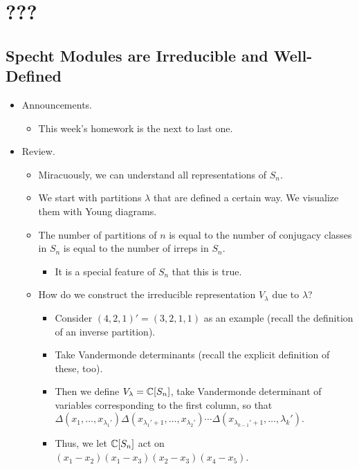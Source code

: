 \documentclass[../notes.tex]{subfiles}
\begin{document}
\chapter{???}
\section{Specht Modules are Irreducible and Well-Defined}
\begin{itemize}
    \item {}Announcements.
    \begin{itemize}
        \item This week's homework is the next to last one.
    \end{itemize}
    \item Review.
    \begin{itemize}
        \item Miracuously, we can understand all representations of $S_n$.
        \item We start with partitions $\lambda$ that are defined a certain way. We visualize them with Young diagrams.
        \item The number of partitions of $n$ is equal to the number of conjugacy classes in $S_n$ is equal to the number of irreps in $S_n$.
        \begin{itemize}
            \item It is a special feature of $S_n$ that this is true.
        \end{itemize}
        \item How do we construct the irreducible representation $V_\lambda$ due to $\lambda$?
        \begin{itemize}
            \item Consider $(4,2,1)'=(3,2,1,1)$ as an example (recall the definition of an inverse partition).
            \item Take Vandermonde determinants (recall the explicit definition of these, too).
            \item Then we define $V_\lambda=\mathbb{C}[S_n]$, take Vandermonde determinant of variables corresponding to the first column, so that $\Delta(x_1,\dots,x_{\lambda_1'})\Delta(x_{\lambda_1'+1},\dots,x_{\lambda_2'})\cdots\Delta(x_{\lambda_{k-1}'+1},\dots,\lambda_k')$.
            \item Thus, we let $\mathbb{C}[S_n]$ act on $(x_1-x_2)(x_1-x_3)(x_2-x_3)(x_4-x_5)$.
        \end{itemize}
    \end{itemize}

\end{itemize}
\end{document}
